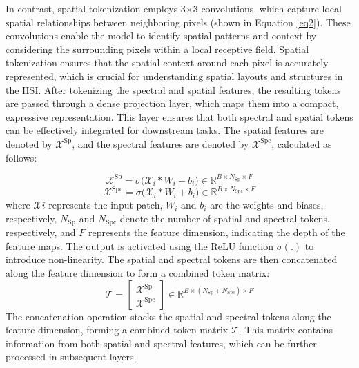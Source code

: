 \documentclass[journal]{IEEEtran}
\begin{document}
In contrast, spatial tokenization employs 3$\times$3 convolutions, which capture local spatial relationships between neighboring pixels (shown in Equation \ref{eq2}). These convolutions enable the model to identify spatial patterns and context by considering the surrounding pixels within a local receptive field. Spatial tokenization ensures that the spatial context around each pixel is accurately represented, which is crucial for understanding spatial layouts and structures in the HSI. After tokenizing the spectral and spatial features, the resulting tokens are passed through a dense projection layer, which maps them into a compact, expressive representation. This layer ensures that both spectral and spatial tokens can be effectively integrated for downstream tasks. The spatial features are denoted by $\mathcal{X}^{\text{Sp}}$, and the spectral features are denoted by $\mathcal{X}^{\text{Spc}}$, calculated as follows:

\begin{equation}
    \mathcal{X}^{\text{Sp}} = \sigma \big(\mathcal{X}_i * W_i + b_i\big) \in \mathbb{R}^{B \times N_{\text{Sp}} \times F}
    \label{eq1}
\end{equation}
\begin{equation}
    \mathcal{X}^{\text{Spc}} = \sigma \big(\mathcal{X}_i * W_i + b_i\big) \in \mathbb{R}^{B \times N_{\text{Spc}} \times F}
    \label{eq2}
\end{equation}
where $\mathcal{X}i$ represents the input patch, $W_i$ and $b_i$ are the weights and biases, respectively, $N_{\text{Sp}}$ and $N_{\text{Spc}}$ denote the number of spatial and spectral tokens, respectively, and $F$ represents the feature dimension, indicating the depth of the feature maps. The output is activated using the ReLU function $\sigma(.)$ to introduce non-linearity. The spatial and spectral tokens are then concatenated along the feature dimension to form a combined token matrix:
\begin{equation}
    \mathcal{T} = \begin{bmatrix}
    \mathcal{X}^{\text{Sp}}\\
    \mathcal{X}^{\text{Spc}}
\end{bmatrix} 
\in  \mathbb{R}^{B \times (N_{\text{Sp}} + N_{\text{Spc}}) \times F} 
\end{equation}
The concatenation operation stacks the spatial and spectral tokens along the feature dimension, forming a combined token matrix $\mathcal{T}$. This matrix contains information from both spatial and spectral features, which can be further processed in subsequent layers.
\end{document}
